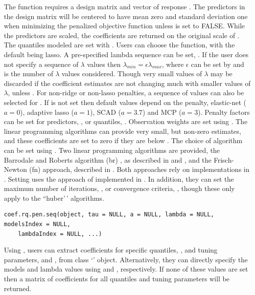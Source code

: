 The function  requires a design matrix  and vector of response . The predictors in the design matrix will be centered to have mean zero and standard deviation one when minimizing the penalized objective function unless  is set to FALSE. While the predictors are scaled, the coefficients are returned on the original scale of . The quantiles modeled are set with . Users can choose the  function, with the default being lasso. A pre-specified lambda sequence can be set, . If the user does not specify a sequence of \(\lambda\) values then \(\lambda_{min}=\epsilon\lambda_{max}\), where \(\epsilon\) can be set by  and  is the number of \(\lambda\) values considered. Though very small values of \(\lambda\) may be discarded if the coefficient estimates are not changing much with smaller values of \(\lambda\), unless . For non-ridge or non-lasso penalties, a sequence of values can also be selected for . If  is not set then default values depend on the penalty, elastic-net (\(a=0\)), adaptive lasso (\(a=1\)), SCAD (\(a=3.7\)) and MCP (\(a=3\)). Penalty factors can be set for predictors, , or quantiles, . Observation weights are set using . The linear programming algorithms can provide very small, but non-zero estimates, and these coefficients are set to zero if they are below . The choice of algorithm can be set using . Two linear programming algorithms are provided, the Barrodale and Roberts algorithm (br) \citep{br}, as described in \citet{crq1} and \citet{crq2}, and the Frisch-Newton (fn) approach, described in \citet{portnoy1997}. Both approaches rely on implementations in . Setting  uses the approach of \citet{huber_cd} implemented in . In addition, they can set the maximum number of iterations, , or convergence criteria, , though these only apply to the ``huber'\,' algorithms.

\begin{verbatim}
coef.rq.pen.seq(object, tau = NULL, a = NULL, lambda = NULL, modelsIndex = NULL,
    lambdaIndex = NULL, ...)
\end{verbatim}

Using , users can extract coefficients for specific quantiles, , and tuning parameters,  and , from class `' object. Alternatively, they can directly specify the models and lambda values using  and , respectively. If none of these values are set then a matrix of coefficients for all quantiles and tuning parameters will be returned. \newline

